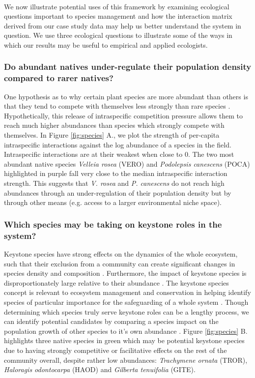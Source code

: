 \documentclass[a4,12pt]{article}
\begin{document}
    \paragraph{}
    We now illustrate potential uses of this framework by examining ecological questions important to species management and how the interaction matrix derived from our case study data may help us better understand the system in question. 
    We use three ecological questions to illustrate some of the ways in which our results may be useful to empirical and applied ecologists.
 
    \subsubsection*{Do abundant natives under-regulate their population density compared to rarer natives?}
    One hypothesis as to why certain plant species are more abundant than others is that they tend to compete with themselves less strongly than rare species \parencite{Yenni2012, Yenni2017}. Hypothetically, this release of intraspecific competition pressure allows them to reach much higher abundances than species which strongly compete with themselves. In Figure \ref{fig:species} A., we plot the strength of per-capita intraspecific interactions against the log abundance of a species in the field. Intraspecific interactions are at their weakest when close to $0$. The two most abundant native species \textit{Velleia rosea} (VERO) and \textit{Podolepsis canescens} (POCA) highlighted in purple fall very close to the median intraspecific interaction strength. This suggests that \textit{V. rosea} and \textit{P. canescens} do not reach high abundances through an under-regulation of their population density but by through other means (e.g. access to a larger environmental niche space). 


    \subsubsection*{Which species may be taking on keystone roles in the system?}
    Keystone species have strong effects on the dynamics of the whole ecosystem, such that their exclusion from a community can create significant changes in species density and composition \parencite{Paine1969}. Furthermore, the impact of keystone species is disproportionately large relative to their abundance \parencite{Power1996, Piraino2002, Libralato2006}. The keystone species concept is  relevant to ecosystem management and conservation in helping identify species of particular importance for the safeguarding of a whole system \parencite{Soule2005a}. Though determining which species truly serve keystone roles can be a lengthy process, we can identify potential candidates by comparing a species impact on the population growth of other species to it's own abundance \parencite{Libralato2006}. Figure \ref{fig:species} B. highlights three native species in green which may be potential keystone species due to having strongly competitive or facilitative effects on the rest of the community overall, despite rather low abundances: \textit{Trachymene ornata} (TROR), \textit{Haloragis odontocarpa} (HAOD) and \textit{Gilberta tenuifolia} (GITE). 
\end{document}
